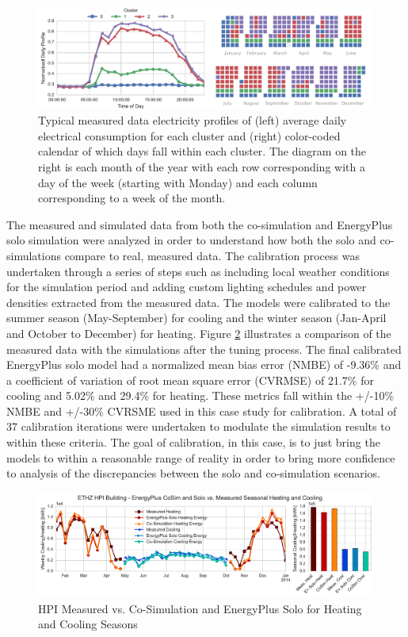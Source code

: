 \documentclass{tBPS2e}
\theoremstyle{plain}
\theoremstyle{definition}
\theoremstyle{remark}
\begin{document}
\begin{figure}[H]
\centering
\includegraphics[scale=0.55]{figures/HPI_combinedclusterandcal_5}
\caption{Typical measured data electricity profiles of (left) average daily electrical consumption for each cluster and (right)
color-coded calendar of which days fall within each cluster. The diagram on the right is each month of the year with each row corresponding with
a day of the week (starting with Monday) and each column corresponding to a week of the month.}
\label{fig:hpi_elec_profiles}
\end{figure}

The measured and simulated data from both the co-simulation and EnergyPlus
solo simulation were analyzed in order to understand how both the solo and co-simulations 
compare to real, measured data. The calibration process was undertaken through a series of steps
such as including local weather conditions for the simulation period and
adding custom lighting schedules and power densities extracted from the
measured data. The models were calibrated to the summer season (May-September)
for cooling and the winter season (Jan-April and October to December) for
heating. Figure \ref{fig:hpi_measvssim} illustrates a comparison of the measured data with the
simulations after the tuning process. The final calibrated EnergyPlus solo
model had a normalized mean bias error (NMBE) of -9.36\% and a coefficient of
variation of root mean square error (CVRMSE) of 21.7\% for cooling and 5.02\%
and 29.4\% for heating. These metrics fall within the +/-10\% NMBE and +/-30\%
CVRSME used in this case study for calibration. A total of 37 calibration iterations were undertaken 
to modulate the simulation results to within these criteria. The
goal of calibration, in this case, is to just bring the models to within a
reasonable range of reality in order to bring more confidence to analysis of
the discrepancies between the solo and co-simulation
scenarios.


\begin{figure}[H]
\centering
\includegraphics[scale=0.55]{figures/HPI_MeasvsSim}
\caption{HPI Measured vs. Co-Simulation and EnergyPlus Solo for Heating and Cooling Seasons}
\label{fig:hpi_measvssim}
\end{figure}
\end{document}
